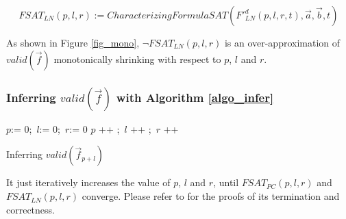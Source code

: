 \documentclass[runningheads,a4paper,orivec]{llncs}
\begin{document}
\begin{equation}\label{fsat_ln}
FSAT_{LN}(p,l,r):=CharacterizingFormulaSAT(F'^d_{LN}(p,l,r,t),\vec{a},\vec{b},t)
\end{equation}

As shown in Figure \ref{fig_mono},
% 
$\neg FSAT_{LN}(p,l,r)$ is an over-approximation of $valid(\vec{f})$ monotonically shrinking with respect to
$p$, $l$ and $r$.




\subsubsection{Inferring $valid(\vec{f})$ with Algorithm \ref{algo_infer}}\label{subsub_overal}
\begin{algorithm}[t]
\SetAlgoVlined
$p$:= $0$;~$l$:= $0$;~$r$:= $0$ \;
 {
  $p$ ++ ;~$l$ ++ ;~$r$ ++ \;
}
\caption{Inferring $valid(\vec{f}_{p+l})$}
\label{algo_infer}
\end{algorithm}

It just iteratively increases the value of $p$, $l$ and $r$, 
until $FSAT_{PC}(p,l,r)$ and $FSAT_{LN}(p,l,r)$ converge.
Please refer to \cite{QinTODAES15} for the proofs of its termination and correctness.
\end{document}
